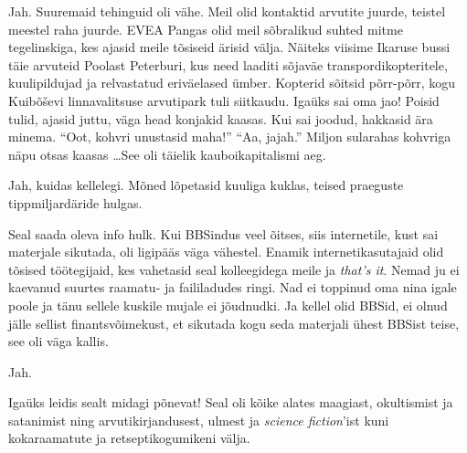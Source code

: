 
Jah. Suuremaid tehinguid oli vähe. Meil olid kontaktid arvutite juurde, 
teistel meestel raha juurde. 
EVEA Pangas olid meil sõbralikud suhted mitme tegelinskiga, kes 
ajasid meile tõsiseid ärisid välja. Näiteks viisime Ikaruse 
bussi täie arvuteid Poolast Peterburi, kus need laaditi
sõjaväe transpordikopteritele, kuulipildujad ja relvastatud eriväelased ümber. Kopterid sõitsid põrr-põrr, kogu 
Kuibõševi linnavalitsuse arvutipark tuli siitkaudu. Igaüks sai oma jao! 
Poisid tulid, ajasid juttu, väga head konjakid kaasas. Kui sai joodud, 
hakkasid ära minema. \enquote{Oot, kohvri unustasid maha!} \enquote{Aa, jajah.} Miljon 
sularahas kohvriga näpu otsas kaasas \ldots See oli täielik
kauboikapitalismi aeg. 


Jah, kuidas kellelegi. Mõned lõpetasid kuuliga kuklas, teised 
praeguste tippmiljardäride hulgas. 


Seal saada oleva info hulk. Kui BBSindus veel õitses, siis internetile, kust 
sai materjale sikutada, oli ligipääs väga vähestel. Enamik internetikasutajaid olid tõsised töötegijaid, kes vahetasid seal 
kolleegidega meile ja \emph{that's it}. Nemad ju ei kaevanud 
suurtes raamatu- ja faililadudes ringi. Nad ei 
toppinud oma nina igale poole ja tänu sellele kuskile mujale ei jõudnudki. Ja 
kellel olid BBSid, ei olnud jälle sellist finantsvõimekust, et sikutada kogu 
seda materjali ühest BBSist teise, see oli väga kallis.


Jah.


Igaüks leidis sealt midagi põnevat! Seal oli kõike alates maagiast, 
okultismist ja satanimist ning arvutikirjandusest, ulmest ja \emph{science 
fiction}'ist kuni kokaraamatute ja retseptikogumikeni välja.



